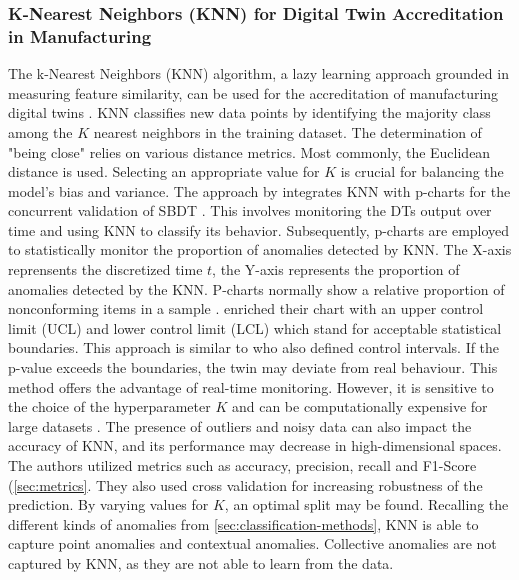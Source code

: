 \subsubsection*{K-Nearest Neighbors (KNN) for Digital Twin Accreditation in Manufacturing}
The k-Nearest Neighbors (KNN) algorithm, a lazy learning approach grounded in measuring feature similarity, can be used for the accreditation of manufacturing digital twins \autocite{dos2024simulation}. KNN classifies new data points by identifying the majority class among the $K$ nearest neighbors in the training dataset. The determination of "being close" relies on various distance metrics. Most commonly, the Euclidean distance is used. Selecting an appropriate value for $K$ is crucial for balancing the model's bias and variance.
The approach by \autocite{dos2024simulation} integrates KNN with p-charts for the concurrent validation of SBDT \autocite{dos2024digital}. This involves monitoring the DTs output over time and using KNN to classify its behavior. Subsequently, p-charts are employed to statistically monitor the proportion of anomalies detected by KNN. The X-axis reprensents the discretized time $t$, the Y-axis represents the proportion of anomalies detected by the KNN. P-charts normally show a relative proportion of nonconforming items in a sample \autocite{acosta1999improved}. \Autocite{dos2024simulation} enriched their chart with an upper control limit (UCL) and lower control limit (LCL) which stand for acceptable statistical boundaries. This approach is similar to \autocite{Nie2023rcim} who also defined control intervals. If the p-value exceeds the boundaries, the twin may deviate from real behaviour. This method offers the advantage of real-time monitoring. However, it is sensitive to the choice of the hyperparameter $K$ and can be computationally expensive for large datasets \autocite{dos2024simulation}. The presence of outliers and noisy data can also impact the accuracy of KNN, and its performance may decrease in high-dimensional spaces. The authors utilized metrics such as accuracy, precision, recall and F1-Score (\autoref{sec:metrics}. They also used cross validation for increasing robustness of the prediction. By varying values for $K$, an optimal split may be found. Recalling the different kinds of anomalies from \autoref{sec:classification-methods}, KNN is able to capture point anomalies and contextual anomalies. Collective anomalies are not captured by KNN, as they are not able to learn from the data.


